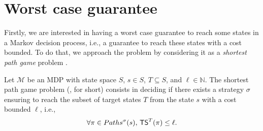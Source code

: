 \section{Worst case guarantee} \label{worst-case-guarantee}
Firstly, we are interested in having a worst case guarantee to reach some states in a Markov decision process, i.e., a guarantee to reach these states with a cost bounded.
To do that, we approach the problem by considering it as a \textit{shortest path game} problem \cite{DBLP:journals/corr/RandourRS14a}.
\begin{definition}
  Let $\mathcal{M}$ be an MDP with state space $S$, $s \in S$, $T \subseteq S$, and $\ell \in \mathbb{N}$.
  The shortest path game problem (\SPG{}, for short) consists in deciding if there exists a strategy $\sigma$ ensuring to reach the subset of target states $T$ from the state $s$ with a cost bounded $\ell$, i.e.,
  \begin{align*}
    \forall \pi \in Paths^\sigma(s), \, \text{\sffamily TS}^T(\pi) \leq \ell.
  \end{align*}
\end{definition}

